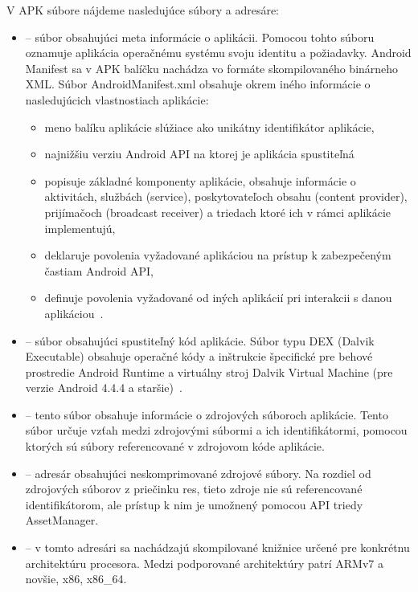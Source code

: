 V APK súbore nájdeme nasledujúce súbory a adresáre:
\begin{itemize}

	\item {} -- súbor obsahujúci meta informácie o aplikácii. Pomocou tohto súboru oznamuje aplikácia operačnému systému svoju identitu a požiadavky. Android Manifest sa v APK balíčku nachádza vo formáte skompilovaného binárneho XML.
Súbor AndroidManifest.xml obsahuje okrem iného informácie o nasledujúcich vlastnostiach aplikácie:
		
		\begin{itemize}
			\item meno balíku aplikácie slúžiace ako unikátny identifikátor aplikácie,
			\item najnižšiu verziu Android API na ktorej je aplikácia spustiteľná
			\item popisuje základné komponenty aplikácie, obsahuje informácie o aktivitách, službách (service), poskytovateľoch obsahu (content provider), prijímačoch (broadcast receiver) a triedach ktoré ich v rámci aplikácie implementujú,
			\item deklaruje povolenia vyžadované aplikáciou na prístup k zabezpečeným častiam Android API,
			\item definuje povolenia vyžadované od iných aplikácií pri interakcii s danou aplikáciou~\cite{Manifest}.
		\end{itemize}
	
	\item {} -- súbor obsahujúci spustiteľný kód aplikácie. Súbor typu DEX (Dalvik Executable) obsahuje operačné kódy a inštrukcie špecifické pre behové prostredie Android Runtime a virtuálny stroj Dalvik Virtual Machine (pre verzie Android 4.4.4 a staršie)~\cite{DexFormat}. 

	\item {} -- tento súbor obsahuje informácie o zdrojových súboroch aplikácie. Tento súbor určuje vzťah medzi zdrojovými súbormi a ich identifikátormi, pomocou ktorých sú súbory referencované v zdrojovom kóde aplikácie.
	
	\item {} -- adresár obsahujúci neskomprimované zdrojové súbory.  Na rozdiel od zdrojových súborov z priečinku res, tieto zdroje nie sú referencované identifikátorom, ale prístup k nim je umožnený pomocou API triedy AssetManager.
	
	\item {} -- v tomto adresári sa nachádzajú skompilované knižnice určené pre konkrétnu architektúru procesora. Medzi podporované architektúry patrí ARMv7 a novšie, x86, x86\_64.


\end{itemize}
